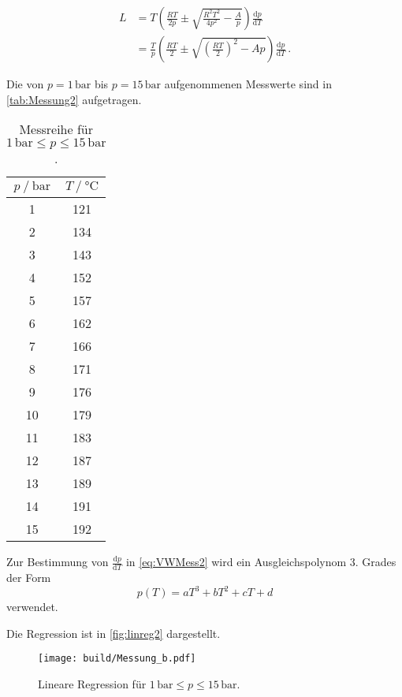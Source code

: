 \begin{align}
  L &= T \left(\frac{RT}{2p} \pm \sqrt{\frac{R^2 T^2}{4 p^2} - \frac{A}{p}} \right) 
  \frac{\mathrm{d}p}{\mathrm{d}T} \\
    &= \frac{T}{p} \left(\frac{RT}{2} \pm \sqrt{\left(\frac{R T}{2} \right)^2 - A p}\right) 
    \frac{\mathrm{d}p}{\mathrm{d}T} \,. 
    \label{eq:VWMess2}
\end{align}

\newpage

Die von $p = 1 \,\unit{\bar}$ bis $p = 15 \,\unit{\bar}$ aufgenommenen Messwerte sind in 
\autoref{tab:Messung2} aufgetragen.

\begin{table}[H]
  \centering
  \caption{Messreihe für  $1 \,\unit{\bar} \leq p \leq 15 \,\unit{\bar} $.}
  \label{tab:Messung2}
  \begin{tabular}{S S}
    \toprule
    {$p \mathbin{/} \unit{\bar}$} & {$T \mathbin{/} \unit{\celsius}$} \\
     & 121 \\
     2 & 134 \\
     3 & 143 \\
     4 & 152 \\
     5 & 157 \\
     6 & 162 \\
     7 & 166 \\
     8 & 171 \\
     9 & 176 \\
    10 & 179 \\
    11 & 183 \\
    12 & 187 \\
    13 & 189 \\
    14 & 191 \\
    15 & 192 \\
    \bottomrule
  \end{tabular}
\end{table}

Zur Bestimmung von $\frac{\mathrm{d}p}{\mathrm{d}T}$ in \eqref{eq:VWMess2} wird ein Ausgleichspolynom
3. Grades der Form
\begin{equation*}
  p(T) = a T^3 + b T^2 + c T + d
\end{equation*} verwendet.

Die Regression ist in \autoref{fig:linreg2} dargestellt.

\begin{figure}
  \centering
  \texttt{[image: build/Messung\_b.pdf]}
  \caption{Lineare Regression für $1 \,\unit{\bar} \leq p \leq 15 \,\unit{\bar}$.}
  \label{fig:linreg2}
\end{figure}

